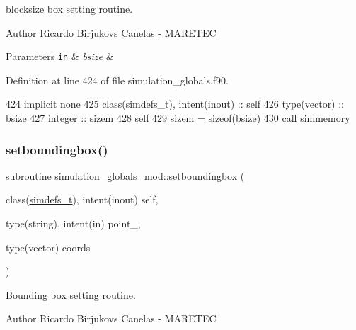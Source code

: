 blocksize box setting routine. 

\begin{DoxyAuthor}{Author}
Ricardo Birjukovs Canelas -\/ M\+A\+R\+E\+T\+EC
\end{DoxyAuthor}

\begin{DoxyParams}[1]{Parameters}
\mbox{\tt in}  & {\em bsize} & \\
\hline
\end{DoxyParams}


Definition at line 424 of file simulation\+\_\+globals.\+f90.


\begin{DoxyCode}
424     \textcolor{keywordtype}{implicit none}
425     \textcolor{keywordtype}{class}(simdefs\_t), \textcolor{keywordtype}{intent(inout)} :: self
426     \textcolor{keywordtype}{type}(vector) :: bsize
427     \textcolor{keywordtype}{integer} :: sizem
428     self%
429     sizem = sizeof(bsize)
430     \textcolor{keyword}{call }simmemory%
\end{DoxyCode}
\mbox{\label{namespacesimulation__globals__mod_a412b0779703630189e2ea14e4b390864}} 
\subsubsection{\texorpdfstring{setboundingbox()}{setboundingbox()}}
{\footnotesize\ttfamily subroutine simulation\+\_\+globals\+\_\+mod\+::setboundingbox (\begin{DoxyParamCaption}\item[{class(\mbox{\hyperlink{structsimulation__globals__mod_1_1simdefs__t}{simdefs\+\_\+t}}), intent(inout)}]{self,  }\item[{type(string), intent(in)}]{point\+\_\+,  }\item[{type(vector)}]{coords }\end{DoxyParamCaption})\hspace{0.3cm}{\ttfamily [private]}}



Bounding box setting routine. 

\begin{DoxyAuthor}{Author}
Ricardo Birjukovs Canelas -\/ M\+A\+R\+E\+T\+EC
\end{DoxyAuthor}

